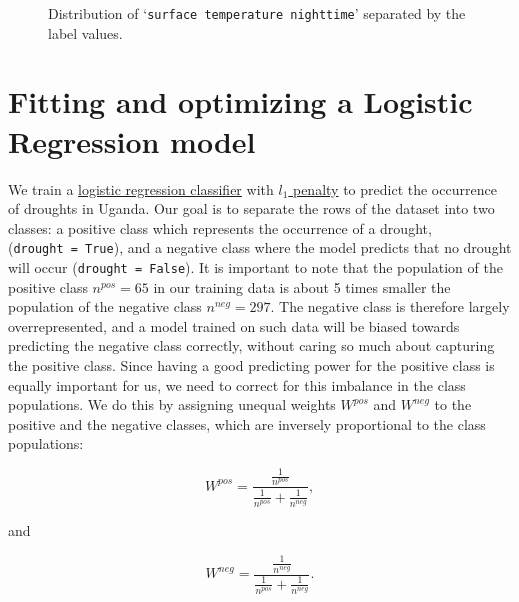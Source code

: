 \documentclass[10pt,parskip=half,
toc=sectionentrywithdots,
bibliography=totocnumbered,
captions=tableheading,numbers=noendperiod]{scrartcl}
\begin{document}
\begin{figure}[H]\begin{center}\end{center}\caption{Distribution of `\texttt{surface\ temperature\ nighttime}' separated by
the label values.}\label{fig_dist19}\end{figure}

\hypertarget{fitting-and-optimizing-a-logistic-regression-model}{%
\section{Fitting and optimizing a Logistic Regression
model}\label{fitting-and-optimizing-a-logistic-regression-model}}

We train a
\href{https://scikit-learn.org/stable/modules/generated/sklearn.linear_model.LogisticRegression.html}{logistic
regression classifier} with
\href{https://scikit-learn.org/stable/auto_examples/linear_model/plot_logistic_l1_l2_sparsity.html}{\(l_1\)
penalty} to predict the occurrence of droughts in Uganda. Our goal is to
separate the rows of the dataset into two classes: a positive class
which represents the occurrence of a drought,
(\texttt{drought\ =\ True}), and a negative class where the model
predicts that no drought will occur (\texttt{drought\ =\ False}). It is
important to note that the population of the positive class
\(n^{pos}= 65\) in our training data is about 5 times smaller the
population of the negative class \(n^{neg}= 297\). The negative class is
therefore largely overrepresented, and a model trained on such data will
be biased towards predicting the negative class correctly, without
caring so much about capturing the positive class. Since having a good
predicting power for the positive class is equally important for us, we
need to correct for this imbalance in the class populations. We do this
by assigning unequal weights \(W^{pos}\) and \(W^{neg}\) to the positive
and the negative classes, which are inversely proportional to the class
populations:

\begin{equation}\label{eqn_wpos}
W^{pos}=\frac{\frac{1}{n^{pos}}}{\frac{1}{n^{pos}}+\frac{1}{n^{neg}}},
\end{equation}

and

\begin{equation}\label{eqn_wneg}
W^{neg}=\frac{\frac{1}{n^{neg}}}{\frac{1}{n^{pos}}+\frac{1}{n^{neg}}}.
\end{equation}
\end{document}
